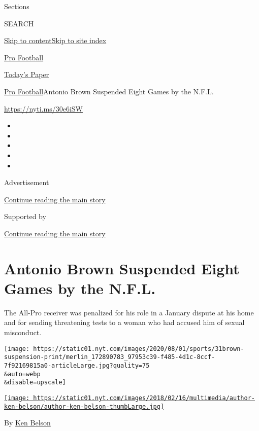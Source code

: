 Sections

SEARCH

\protect\hyperlink{site-content}{Skip to
content}\protect\hyperlink{site-index}{Skip to site index}

\href{https://www.nytimes.com/section/sports/football}{Pro Football}

\href{https://myaccount.nytimes.com/auth/login?response_type=cookie\&client_id=vi}{}

\href{https://www.nytimes.com/section/todayspaper}{Today's Paper}

\href{/section/sports/football}{Pro Football}\textbar{}Antonio Brown
Suspended Eight Games by the N.F.L.

\url{https://nyti.ms/30e6iSW}

\begin{itemize}
\item
\item
\item
\item
\item
\end{itemize}

Advertisement

\protect\hyperlink{after-top}{Continue reading the main story}

Supported by

\protect\hyperlink{after-sponsor}{Continue reading the main story}

\hypertarget{antonio-brown-suspended-eight-games-by-the-nfl}{%
\section{Antonio Brown Suspended Eight Games by the
N.F.L.}\label{antonio-brown-suspended-eight-games-by-the-nfl}}

The All-Pro receiver was penalized for his role in a January dispute at
his home and for sending threatening tests to a woman who had accused
him of sexual misconduct.

\texttt{[image: https://static01.nyt.com/images/2020/08/01/sports/31brown-suspension-print/merlin\_172890783\_97953c39-f485-4d1c-8ccf-7f92169815a0-articleLarge.jpg?quality=75\\\&auto=webp\\\&disable=upscale]}

\href{https://www.nytimes.com/by/ken-belson}{\texttt{[image: https://static01.nyt.com/images/2018/02/16/multimedia/author-ken-belson/author-ken-belson-thumbLarge.jpg]}}

By \href{https://www.nytimes.com/by/ken-belson}{Ken Belson}

